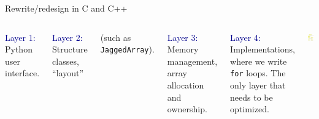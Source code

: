 \documentclass[aspectratio=169]{beamer}
\begin{document}
\begin{frame}{Rewrite/redesign in C and C++}
\large
\vspace{0.5 cm}
\begin{columns}
\vspace{-0.2 cm}

\textcolor{darkblue}{Layer 1:} Python user interface.
\vspace{2\baselineskip}

\vspace{0.18 cm}
\textcolor{darkblue}{Layer 2:} Structure classes, ``layout''

(such as \texttt{JaggedArray}).
\vspace{\baselineskip}

\vspace{0.18 cm}
\textcolor{darkblue}{Layer 3:} Memory management, array allocation and ownership.
\vspace{2\baselineskip}

\vspace{0.18 cm}
\textcolor{darkblue}{Layer 4:} Implementations, where we write \texttt{for} loops. The only layer that needs to be optimized.

\includegraphics[width=\linewidth]{awkward-1-0-layers.pdf}
\end{columns}
\end{frame}
\end{document}
